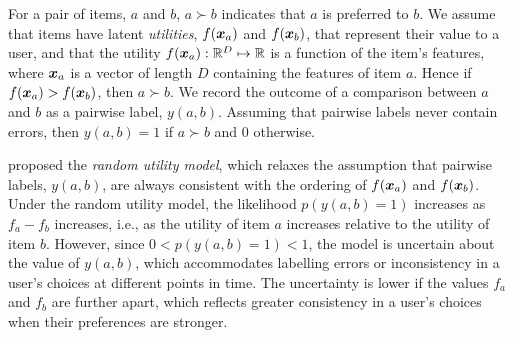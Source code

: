 
For a pair of items, $a$ and $b$, 
$a \succ b$ indicates that $a$ is preferred to $b$.  
We assume that items have latent \emph{utilities},
$f(\boldsymbol x_a)$ and $f(\boldsymbol x_b)$, that represent their value to a user,
and that the 
utility $f(\boldsymbol x_a) : \mathbb{R}^D \mapsto \mathbb{R}$ 
is a function of the item's features, where $\boldsymbol x_a$ is a vector of length $D$
containing the features of item $a$.
Hence if $f(\boldsymbol x_a) > f(\boldsymbol x_b)$, then $a \succ b$.
We record the outcome of a comparison between $a$ and $b$ as 
a pairwise label, $y(a, b)$.
Assuming that pairwise labels never contain errors,
then $y(a, b)=1$ if $a \succ b$ and $0$ otherwise.

\citet{thurstone1927law} proposed the \emph{random utility model},
which relaxes the assumption that pairwise labels, $y(a, b)$,
are always consistent with the ordering of $f(\boldsymbol x_a)$ and $f(\boldsymbol x_b)$.
Under the random utility model, the likelihood $p(y(a,b)=1)$ 
increases as $f_a - f_b$ increases, i.e.,
as the utility of item $a$ increases
relative to the utility of item $b$.
However, since $0 < p(y(a,b)=1) < 1$, the model 
is uncertain about the value of $y(a,b)$,
which accommodates labelling errors or
inconsistency in a user's choices at different points in time.
The uncertainty is lower if the values $f_a$ and $f_b$ are further apart, 
which reflects greater consistency in a user's choices
when their preferences are stronger.
 
